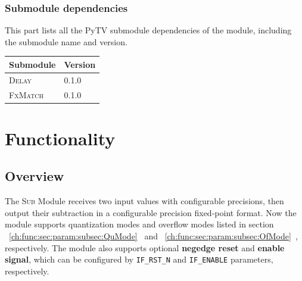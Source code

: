 \documentclass[a4paper, oneside]{report}
\begin{document}
            \subsection{Submodule dependencies}
                This part lists all the PyTV submodule dependencies of the module, including the submodule name and version.
                \begin{longtable}{ll}
                    \toprule
                    \textbf{Submodule} & \textbf{Version} \\
                    \midrule
                    \textsc{Delay}         & 0.1.0 \\
                    \textsc{FxMatch}         & 0.1.0 \\
                    \bottomrule
                \end{longtable}

    \chapter{Functionality}
        \section{Overview}
            The \textsc{Sub} Module receives two input values with configurable precisions, then output their subtraction in a configurable precision fixed-point format. Now the module supports quantization modes and overflow modes listed in section ~\ref{ch:func:sec:param:subsec:QuMode}~ and ~\ref{ch:func:sec:param:subsec:OfMode}~, respectively.  The module also supports optional \textbf{negedge reset} and \textbf{enable signal}, which can be configured by \texttt{IF\_RST\_N} and \texttt{IF\_ENABLE} parameters, respectively.
\end{document}
